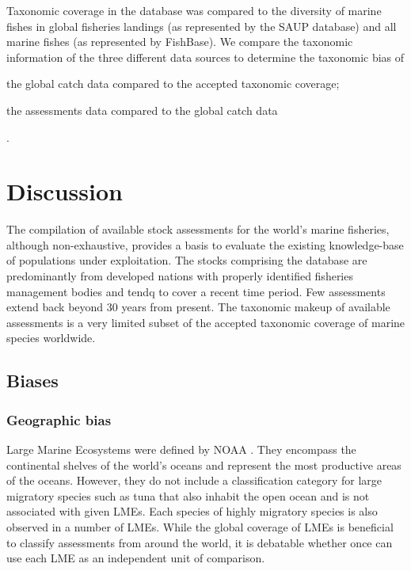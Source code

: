 \documentclass[letterpaper,12pt]{article}
\begin{document}
Taxonomic coverage in the database was compared to the diversity of
marine fishes in global fisheries landings (as represented by the SAUP
database) and all marine fishes (as represented by FishBase). We
compare the taxonomic information of the three different data sources
to determine the taxonomic bias of \begin{inparaenum}[1\upshape)]
\item the global catch data compared to the accepted taxonomic
  coverage; \item the assessments data compared to the global catch
  data \end{inparaenum}.





\newpage
\section{Discussion}

The compilation of available stock assessments for the world's marine
fisheries, although non-exhaustive, provides a basis to evaluate the
existing knowledge-base of populations under exploitation. The stocks
comprising the database are predominantly from developed nations with
properly identified fisheries management bodies and tendq to cover a
recent time period. Few assessments extend back beyond 30 years from
present. The taxonomic makeup of available assessments is a very
limited subset of the accepted taxonomic coverage of marine species
worldwide. 

\subsection{Biases}
\subsubsection{Geographic bias}

Large Marine Ecosystems were defined by NOAA \citep{NOAA:LME64:1998}.
They encompass the continental shelves of the world's oceans and
represent the most productive areas of the oceans.  However, they do
not include a classification category for large migratory species such
as tuna that also inhabit the open ocean and is not associated with
given LMEs. Each species of highly migratory species is also observed
in a number of LMEs. While the global coverage of LMEs is beneficial
to classify assessments from around the world, it is debatable whether
once can use each LME as an independent unit of comparison. 
\end{document}
